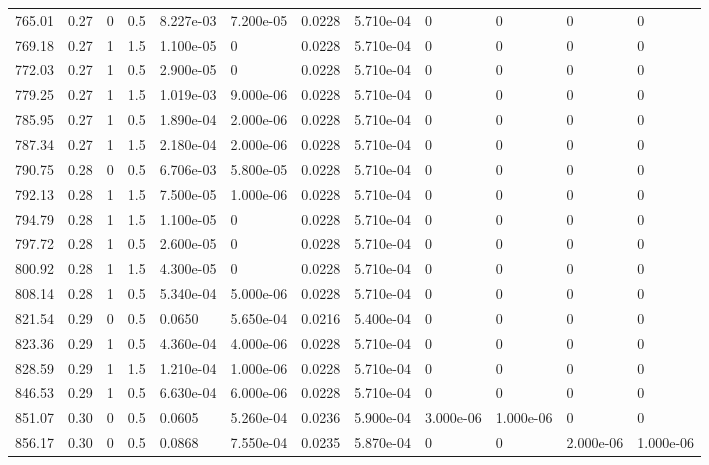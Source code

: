 \documentclass[preview]{standalone}
\begin{document}
{{{{{\begin{tabular}{L{1.2cm}C{1.2cm} C{0.3cm}C{0.5cm} C{1.4cm}C{1.4cm} C{1.4cm}C{1.4cm} C{1.6cm}C{1.6cm} C{1.6cm}C{1.6cm}}
  765.01  &  0.27  & 0     & 0.5 &  8.227e-03  & 7.200e-05  &  0.0228&   5.710e-04& 0 & 0   &  0 & 0  \\ 
  769.18  &  0.27  & 1     & 1.5 &  1.100e-05  & 0  &  0.0228&   5.710e-04& 0 & 0   &  0 & 0  \\ 
  772.03  &  0.27  & 1     & 0.5 &  2.900e-05  & 0  &  0.0228&   5.710e-04& 0 & 0   &  0 & 0  \\ 
  779.25  &  0.27  & 1     & 1.5 &  1.019e-03  & 9.000e-06  &  0.0228&   5.710e-04& 0 & 0   &  0 & 0  \\ 
  785.95  &  0.27  & 1     & 0.5 &  1.890e-04  & 2.000e-06  &  0.0228&   5.710e-04& 0 & 0   &  0 & 0  \\ 
  787.34  &  0.27  & 1     & 1.5 &  2.180e-04  & 2.000e-06  &  0.0228&   5.710e-04& 0 & 0   &  0 & 0  \\ 
  790.75  &  0.28  & 0     & 0.5 &  6.706e-03  & 5.800e-05  &  0.0228&   5.710e-04& 0 & 0   &  0 & 0  \\ 
  792.13  &  0.28  & 1     & 1.5 &  7.500e-05  & 1.000e-06  &  0.0228&   5.710e-04& 0 & 0   &  0 & 0  \\ 
  794.79  &  0.28  & 1     & 1.5 &  1.100e-05  & 0  &  0.0228&   5.710e-04& 0 & 0   &  0 & 0  \\ 
  797.72  &  0.28  & 1     & 0.5 &  2.600e-05  & 0  &  0.0228&   5.710e-04& 0 & 0   &  0 & 0  \\ 
  800.92  &  0.28  & 1     & 1.5 &  4.300e-05  & 0  &  0.0228&   5.710e-04& 0 & 0   &  0 & 0  \\ 
  808.14  &  0.28  & 1     & 0.5 &  5.340e-04  & 5.000e-06  &  0.0228&   5.710e-04& 0 & 0   &  0 & 0  \\ 
  821.54  &  0.29  & 0     & 0.5 &  0.0650  & 5.650e-04  &  0.0216&   5.400e-04& 0 & 0   &  0 & 0  \\ 
  823.36  &  0.29  & 1     & 0.5 &  4.360e-04  & 4.000e-06  &  0.0228&   5.710e-04& 0 & 0   &  0 & 0  \\ 
  828.59  &  0.29  & 1     & 1.5 &  1.210e-04  & 1.000e-06  &  0.0228&   5.710e-04& 0 & 0   &  0 & 0  \\ 
  846.53  &  0.29  & 1     & 0.5 &  6.630e-04  & 6.000e-06  &  0.0228&   5.710e-04& 0 & 0   &  0 & 0  \\ 
  851.07  &  0.30  & 0     & 0.5 &  0.0605  & 5.260e-04  &  0.0236&   5.900e-04& 3.000e-06 & 1.000e-06   &  0 & 0  \\ 
  856.17  &  0.30  & 0     & 0.5 &  0.0868  & 7.550e-04  &  0.0235&   5.870e-04& 0 & 0   &  2.000e-06 & 1.000e-06  \\ 

\end{tabular}}}}}}
\end{document}
